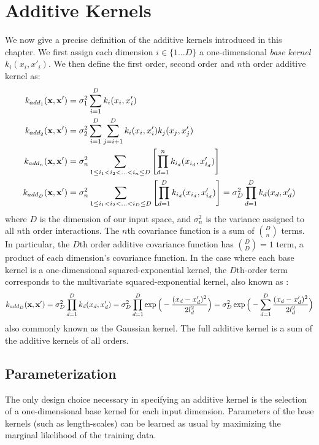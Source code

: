 \section{Additive Kernels}

We now give a precise definition of the additive kernels introduced in this chapter.
We first assign each dimension $i \in \{1 \dots D\}$ a one-dimensional \emph{base kernel} $k_i(x_i, x'_i)$.
We then define the first order, second order and $n$th order additive kernel as:
%
\begin{align}
k_{add_1}({\bf x, x'}) & = \sigma_1^2 \sum_{i=1}^D k_i(x_i, x_i') \\
k_{add_2}({\bf x, x'}) & = \sigma_2^2 \sum_{i=1}^D \sum_{j = i + 1}^D k_i(x_i, x_i') k_j(x_j, x_j') \\
k_{add_n}({\bf x, x'}) & = \sigma_n^2 \sum_{1 \leq i_1 < i_2 < ... < i_n \leq D} \left[ \prod_{d=1}^n k_{i_d}(x_{i_d}, x_{i_d}') \right] \\
k_{add_D}({\bf x, x'}) & = \sigma_n^2 \sum_{1 \leq i_1 < i_2 < ... < i_D \leq D} \left[ \prod_{d=1}^D k_{i_d}(x_{i_d}, x_{i_d}') \right] = \sigma_D^2 \prod_{d=1}^D k_{d}(x_{d}, x_{d}')
\end{align}
%
where $D$ is the dimension of our input space, and $\sigma_n^2$ is the variance assigned to all $n$th order interactions.
The $n$th covariance function is a sum of ${D \choose n}$ terms.
In particular, the $D$th order additive covariance function has ${D \choose D} = 1$ term, a product of each dimension's covariance function.
%
%
In the case where each base kernel is a one-dimensional squared-exponential kernel, the $D$th-order term corresponds to the multivariate squared-exponential kernel, also known as \seard{}:
%
\begin{align}
k_{add_D}({\bf x, x'}) = \sigma_D^2 \prod_{d=1}^D k_{d}(x_{d}, x_{d}') = \sigma_D^2 \prod_{d=1}^D \exp \Big( -\frac{ ( x_{d} - x_{d}')^2}{2l^2_d} \Big) = \sigma_D^2  \exp \Big( -\sum_{d=1}^D \frac{ ( x_{d} - x_{d}')^2}{2l^2_d} \Big)
%
\end{align}
also commonly known as the Gaussian kernel.
The full additive kernel is a sum of the additive kernels of all orders.



\subsection{Parameterization}
The only design choice necessary in specifying an additive kernel is the selection of a one-dimensional base kernel for each input dimension.
Parameters of the base kernels (such as length-scales) can be learned as usual by maximizing the marginal likelihood of the training data.  


